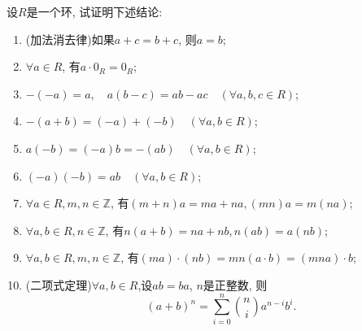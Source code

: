 \documentclass{../solutions-cn}
\begin{document}
\begin{exercise}[习题1.2.1]
    设$R$是一个环, 试证明下述结论:
    \begin{enumerate}[(1)]
        \item (加法消去律)\quad 如果$a + c = b + c$, 则$a = b$;
        \item $\forall a \in R$, 有$a \cdot 0_R = 0_R$;
        \item $-(-a) = a,\quad a(b - c) = ab - ac \quad (\forall a, b, c \in R)$;
        \item $-(a + b) = (-a) + (-b) \quad (\forall a, b \in R)$;
        \item $a(-b) = (-a)b = -(ab) \quad (\forall a, b \in R)$;
        \item $(-a)(-b) = ab \quad (\forall a, b \in R)$;
        \item $\forall a \in R, m, n \in \mathbb{Z}$, 有$(m + n)a = ma + na, (mn)a = m(na)$;
        \item $\forall a, b \in R, n \in \mathbb{Z}$, 有$n(a + b) = na + nb, n(ab) = a(nb)$;
        \item $\forall a, b \in R, m, n \in \mathbb{Z}$, 有$(ma) \cdot (nb) = mn(a \cdot b) = (mna) \cdot b$;
        \item (二项式定理)\quad $\forall a, b \in R$,设$ab = ba$, $n$是正整数, 则
        \[
            (a+b)^n = \sum_{i = 0}^n \binom{n}{i} a^{n - i}b^i.
        \]
    \end{enumerate}
\end{exercise}
\end{document}
